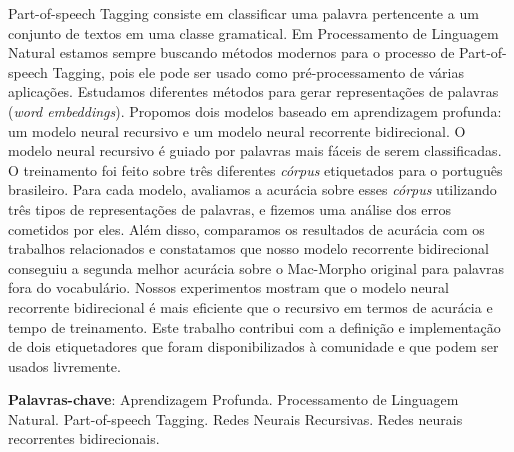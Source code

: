 \begin{resumo}
 
Part-of-speech Tagging consiste em classificar uma palavra pertencente a um conjunto de textos em uma classe gramatical. Em Processamento de Linguagem Natural estamos sempre buscando métodos modernos para o processo de Part-of-speech Tagging, pois ele pode ser usado como pré-processamento de várias aplicações. Estudamos diferentes métodos para gerar representações de palavras (\textit{word embeddings}). Propomos dois modelos baseado em aprendizagem profunda: um modelo neural recursivo e um modelo neural recorrente bidirecional. O modelo neural recursivo é guiado por palavras mais fáceis de serem classificadas. O treinamento foi feito sobre três diferentes \textit{córpus} etiquetados para o português brasileiro. Para cada modelo, avaliamos a acurácia sobre esses \textit{córpus} utilizando três tipos de representações de palavras, e fizemos uma análise dos erros cometidos por eles. Além disso, comparamos os resultados de acurácia com os trabalhos relacionados e constatamos que nosso modelo recorrente bidirecional conseguiu a segunda melhor acurácia sobre o Mac-Morpho original para palavras fora do vocabulário. Nossos experimentos mostram que o modelo neural recorrente bidirecional é mais eficiente que o recursivo em termos de acurácia e tempo de treinamento. Este trabalho contribui com a definição e implementação de dois etiquetadores que foram disponibilizados à comunidade e que podem ser usados livremente.

 \vspace{\onelineskip}
    
 \noindent
 \textbf{Palavras-chave}: Aprendizagem Profunda. Processamento de Linguagem Natural. Part-of-speech Tagging. Redes Neurais Recursivas. Redes neurais recorrentes bidirecionais.
\end{resumo}


